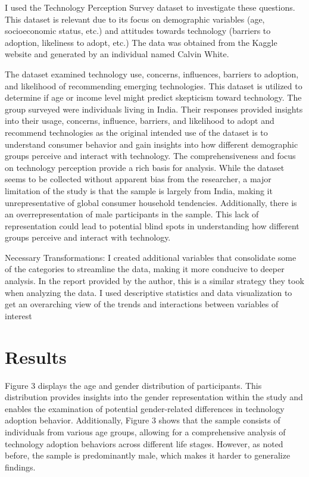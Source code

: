 \documentclass[
]{article}
\begin{document}
I used the Technology Perception Survey dataset to investigate these
questions. This dataset is relevant due to its focus on demographic
variables (age, socioeconomic status, etc.) and attitudes towards
technology (barriers to adoption, likeliness to adopt, etc.) The data
was obtained from the Kaggle website and generated by an individual
named Calvin White.

The dataset examined technology use, concerns, influences, barriers to
adoption, and likelihood of recommending emerging technologies. This
dataset is utilized to determine if age or income level might predict
skepticism toward technology. The group surveyed were individuals living
in India. Their responses provided insights into their usage, concerns,
influence, barriers, and likelihood to adopt and recommend technologies
as the original intended use of the dataset is to understand consumer
behavior and gain insights into how different demographic groups
perceive and interact with technology. The comprehensiveness and focus
on technology perception provide a rich basis for analysis. While the
dataset seems to be collected without apparent bias from the researcher,
a major limitation of the study is that the sample is largely from
India, making it unrepresentative of global consumer household
tendencies. Additionally, there is an overrepresentation of male
participants in the sample. This lack of representation could lead to
potential blind spots in understanding how different groups perceive and
interact with technology.

Necessary Transformations: I created additional variables that
consolidate some of the categories to streamline the data, making it
more conducive to deeper analysis. In the report provided by the author,
this is a similar strategy they took when analyzing the data. I used
descriptive statistics and data visualization to get an overarching view
of the trends and interactions between variables of interest

\hypertarget{results}{%
\section{Results}\label{results}}

Figure 3 displays the age and gender distribution of participants. This
distribution provides insights into the gender representation within the
study and enables the examination of potential gender-related
differences in technology adoption behavior. Additionally, Figure 3
shows that the sample consists of individuals from various age groups,
allowing for a comprehensive analysis of technology adoption behaviors
across different life stages. However, as noted before, the sample is
predominantly male, which makes it harder to generalize findings.
\end{document}
